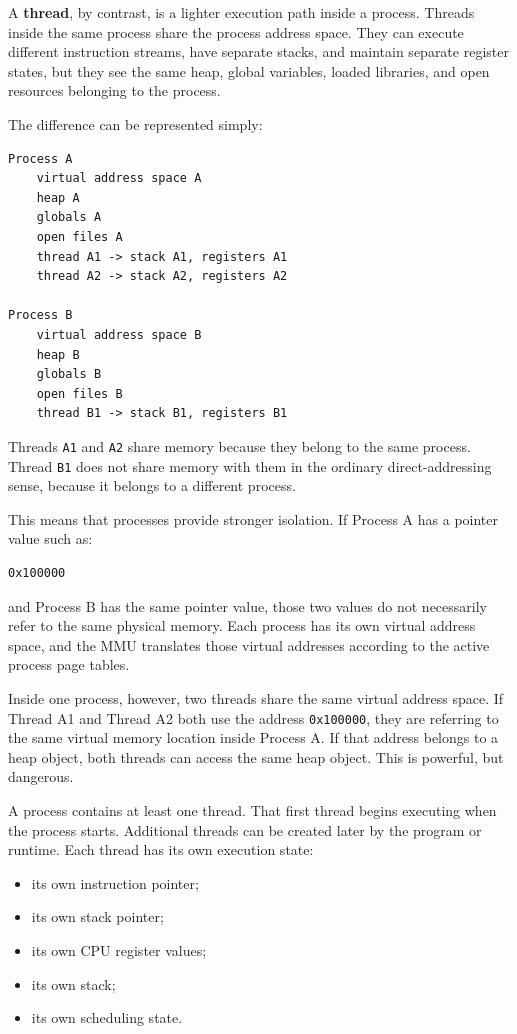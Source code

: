 A \textbf{thread}, by contrast, is a lighter execution path inside a process. Threads inside the same process share the process address space. They can execute different instruction streams, have separate stacks, and maintain separate register states, but they see the same heap, global variables, loaded libraries, and open resources belonging to the process.

The difference can be represented simply:

\begin{verbatim}
Process A
    virtual address space A
    heap A
    globals A
    open files A
    thread A1 -> stack A1, registers A1
    thread A2 -> stack A2, registers A2

Process B
    virtual address space B
    heap B
    globals B
    open files B
    thread B1 -> stack B1, registers B1
\end{verbatim}

Threads \texttt{A1} and \texttt{A2} share memory because they belong to the same process. Thread \texttt{B1} does not share memory with them in the ordinary direct-addressing sense, because it belongs to a different process.

This means that processes provide stronger isolation. If Process A has a pointer value such as:

\begin{verbatim}
0x100000
\end{verbatim}

and Process B has the same pointer value, those two values do not necessarily refer to the same physical memory. Each process has its own virtual address space, and the MMU translates those virtual addresses according to the active process page tables.

Inside one process, however, two threads share the same virtual address space. If Thread A1 and Thread A2 both use the address \texttt{0x100000}, they are referring to the same virtual memory location inside Process A. If that address belongs to a heap object, both threads can access the same heap object. This is powerful, but dangerous.

A process contains at least one thread. That first thread begins executing when the process starts. Additional threads can be created later by the program or runtime. Each thread has its own execution state:

\begin{itemize}
    \item its own instruction pointer;
    \item its own stack pointer;
    \item its own CPU register values;
    \item its own stack;
    \item its own scheduling state.
\end{itemize}

